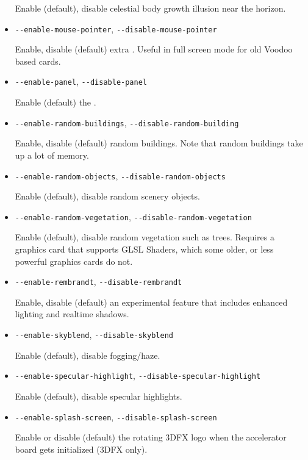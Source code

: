 \begin{itemize}
Enable (default), disable celestial body growth illusion near the horizon.

\item{\texttt{-$ $-enable-mouse-pointer}, \texttt{-$ $-disable-mouse-pointer}}

Enable, disable (default) extra . Useful in full screen mode for old Voodoo based cards.

\item{\texttt{-$ $-enable-panel}, \texttt{-$ $-disable-panel}}

Enable (default) the .

\item{\texttt{-$ $-enable-random-buildings}, \texttt{-$ $-disable-random-building}}

Enable, disable (default) random buildings. Note that random buildings take up a lot of memory.

\item{\texttt{-$ $-enable-random-objects}, \texttt{-$ $-disable-random-objects}}

Enable (default), disable random scenery objects. 

\item{\texttt{-$ $-enable-random-vegetation}, \texttt{-$ $-disable-random-vegetation}}

Enable (default), disable random vegetation such as trees. Requires a graphics card that
supports GLSL Shaders, which some older, or less powerful graphics cards do not.

\item{\texttt{-$ $-enable-rembrandt}, \texttt{-$ $-disable-rembrandt}}

Enable, disable (default) an experimental feature that includes
 enhanced lighting and realtime shadows.

\item{\texttt{-$ $-enable-skyblend}, \texttt{-$ $-disable-skyblend}}

Enable (default), disable fogging/haze.

\item{\texttt{-$ $-enable-specular-highlight}, \texttt{-$ $-disable-specular-highlight}}

Enable (default), disable specular highlights.

\item{\texttt{-$ $-enable-splash-screen}, \texttt{-$ $-disable-splash-screen}}

Enable or disable (default) the rotating 3DFX logo when the accelerator board gets initialized (3DFX only).


\end{itemize}
